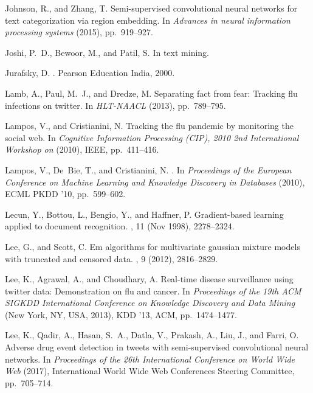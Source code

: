 \documentclass[10pt,letterpaper]{article}
\begin{document}
\begin{thebibliography}{10}
{\sc Johnson, R., and Zhang, T.}
\newblock Semi-supervised convolutional neural networks for text categorization
  via region embedding.
\newblock In {\em Advances in neural information processing systems\/} (2015),
  pp.~919--927.

{\sc Joshi, P.~D., Bewoor, M., and Patil, S.}
\newblock In text mining.

{\sc Jurafsky, D.}
.
\newblock Pearson Education India, 2000.

{\sc Lamb, A., Paul, M.~J., and Dredze, M.}
\newblock Separating fact from fear: Tracking flu infections on twitter.
\newblock In {\em HLT-NAACL\/} (2013), pp.~789--795.

{\sc Lampos, V., and Cristianini, N.}
\newblock Tracking the flu pandemic by monitoring the social web.
\newblock In {\em Cognitive Information Processing (CIP), 2010 2nd
  International Workshop on\/} (2010), IEEE, pp.~411--416.

{\sc Lampos, V., De~Bie, T., and Cristianini, N.}
.
\newblock In {\em Proceedings of the European Conference on Machine Learning
  and Knowledge Discovery in Databases\/} (2010), ECML PKDD '10, pp.~599--602.

{\sc Lecun, Y., Bottou, L., Bengio, Y., and Haffner, P.}
\newblock Gradient-based learning applied to document recognition.
, 11 (Nov 1998), 2278--2324.

{\sc Lee, G., and Scott, C.}
\newblock Em algorithms for multivariate gaussian mixture models with truncated
  and censored data.
, 9 (2012),
  2816--2829.

{\sc Lee, K., Agrawal, A., and Choudhary, A.}
\newblock Real-time disease surveillance using twitter data: Demonstration on
  flu and cancer.
\newblock In {\em Proceedings of the 19th ACM SIGKDD International Conference
  on Knowledge Discovery and Data Mining\/} (New York, NY, USA, 2013), KDD '13,
  ACM, pp.~1474--1477.

{\sc Lee, K., Qadir, A., Hasan, S.~A., Datla, V., Prakash, A., Liu, J., and
  Farri, O.}
\newblock Adverse drug event detection in tweets with semi-supervised
  convolutional neural networks.
\newblock In {\em Proceedings of the 26th International Conference on World
  Wide Web\/} (2017), International World Wide Web Conferences Steering
  Committee, pp.~705--714.


\end{thebibliography}
\end{document}
